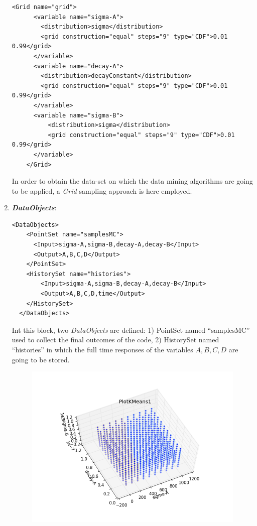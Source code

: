 \begin{enumerate}
\begin{lstlisting}[style=XML,morekeywords={arg,extension,pauseAtEnd,overwrite}]
    <Grid name="grid">
      <variable name="sigma-A">
        <distribution>sigma</distribution>
        <grid construction="equal" steps="9" type="CDF">0.01 0.99</grid>
      </variable>
      <variable name="decay-A">
        <distribution>decayConstant</distribution>
        <grid construction="equal" steps="9" type="CDF">0.01 0.99</grid>
      </variable>
      <variable name="sigma-B">
          <distribution>sigma</distribution>
          <grid construction="equal" steps="9" type="CDF">0.01 0.99</grid>
      </variable>
    </Grid>
\end{lstlisting}
  In order to obtain the data-set on which the data mining algorithms are going to be applied, a \textit{Grid} sampling approach is here employed.
   \item \textbf{\textit{DataObjects}}:
\begin{lstlisting}[style=XML,morekeywords={arg,extension,pauseAtEnd,overwrite}]
  <DataObjects>
    <PointSet name="samplesMC">
      <Input>sigma-A,sigma-B,decay-A,decay-B</Input>
      <Output>A,B,C,D</Output>
    </PointSet>
    <HistorySet name="histories">
        <Input>sigma-A,sigma-B,decay-A,decay-B</Input>
        <Output>A,B,C,D,time</Output>
    </HistorySet>
  </DataObjects>
\end{lstlisting}
  Int this block, two \textit{DataObjects} are defined: 
  1) PointSet named ``samplesMC'' used to collect the final outcomes of 
  the code, 
  2) HistorySet named ``histories'' in which the full time responses of the 
  variables $A,B,C,D$ are going to be stored.
 \begin{figure}[h!]
  \centering
  \includegraphics[scale=0.7]{pics/dataminingK-means.png}

\end{figure}
\end{enumerate}
